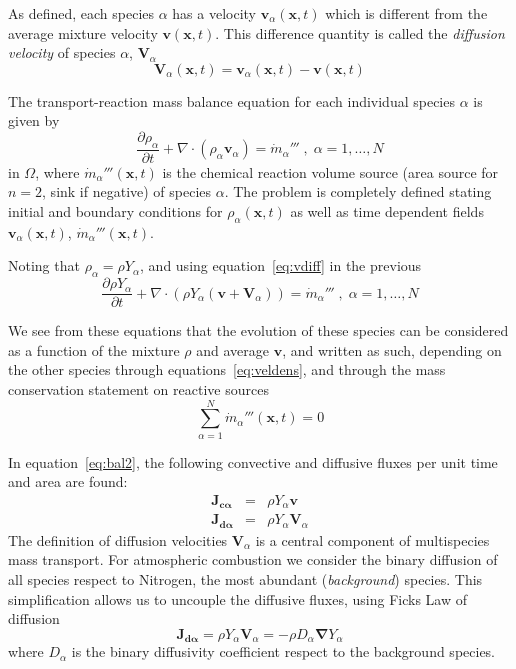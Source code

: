 \documentclass[12pt]{article}
\begin{document}
As defined, each species $\alpha$ has a velocity $\mathbf{v}_\alpha(\mathbf{x},t)$ which is different from the average mixture velocity $\mathbf{v}(\mathbf{x},t)$. This difference quantity is called the \textit{diffusion velocity} of species $\alpha$, $\mathbf{V}_\alpha$
%
\begin{equation}
   \mathbf{V}_\alpha(\mathbf{x},t) = \mathbf{v}_\alpha(\mathbf{x},t) - \mathbf{v}(\mathbf{x},t) \label{eq:vdiff}
\end{equation}
%

The transport-reaction mass balance equation for each individual species $\alpha$ is given by
%
\begin{equation}
   \frac{\partial \rho_\alpha}{ \partial t} + \nabla \cdot (\rho_\alpha  \mathbf{v}_\alpha) = \dot{m}_\alpha''' \; , \; \alpha=1,\dots,N \label{eq:bal}
\end{equation}
%
in $\Omega$, where $\dot{m}_\alpha'''(\mathbf{x},t)$ is the chemical reaction volume source (area source for $n=2$, sink if negative) of species $\alpha$. The problem is completely defined stating initial and boundary conditions for $\rho_\alpha(\mathbf{x},t)$ as well as time dependent fields $\mathbf{v}_\alpha(\mathbf{x},t)$, $\dot{m}_\alpha'''(\mathbf{x},t)$.

Noting that $ \rho_\alpha = \rho Y_\alpha$, and using equation~\eqref{eq:vdiff} in the previous
%
\begin{equation}
   \frac{\partial \rho Y_\alpha}{ \partial t} + \nabla \cdot \left( \rho Y_\alpha  (\mathbf{v}+\mathbf{V}_\alpha) \right) = \dot{m}_\alpha''' \; , \; \alpha=1,\dots,N \label{eq:bal2}
\end{equation}
%

We see from these equations that the evolution of these species can be considered as a function of the mixture $\rho$ and average $\mathbf{v}$, and written as such, depending on the other species through equations~\eqref{eq:veldens}, and through the mass conservation statement on reactive sources
%
\begin{equation}
  \sum\limits_{\alpha=1}^{N} \dot{m}_\alpha'''(\mathbf{x},t) = 0
\end{equation}
%

In equation~\eqref{eq:bal2}, the following convective and diffusive fluxes per unit time and area are found:
%
\begin{eqnarray}
  \mathbf{J_{c \alpha}} &=& \rho Y_\alpha  \mathbf{v} \label{eq:jc} \\
  \mathbf{J_{d \alpha}} &=& \rho Y_\alpha  \mathbf{V}_\alpha \label{eq:jd}
\end{eqnarray}
%
The definition of diffusion velocities $\mathbf{V}_\alpha$ is a central component of multispecies mass transport. For atmospheric combustion we consider the binary diffusion of all species respect to Nitrogen, the most abundant (\textit{background}) species. This simplification allows us to uncouple the diffusive fluxes, using Ficks Law of diffusion
%
\begin{equation}
   \mathbf{J_{d \alpha}} = \rho Y_\alpha  \mathbf{V}_\alpha = - \rho D_\alpha \boldsymbol{\nabla} Y_\alpha \label{eq:fick}
\end{equation}
%
where $D_\alpha$ is the binary diffusivity coefficient respect to the background species.
\end{document}
